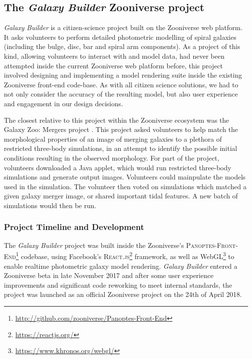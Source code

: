 \documentclass[../main.tex]{subfiles}
\begin{document}
\label{sec:method}

\subsection{The \textit{Galaxy Builder} Zooniverse project}

\textit{Galaxy Builder} is a citizen-science project built on the Zooniverse web platform. It asks volunteers to perform detailed photometric modelling of spiral galaxies (including the bulge, disc, bar and spiral arm components). As a project of this kind, allowing volunteers to interact with and model data, had never been attempted inside the current Zooniverse web platform before, this project involved designing and implementing a model rendering suite inside the existing Zooniverse front-end code-base. As with all citizen science solutions, we had to not only consider the accuracy of the resulting model, but also user experience and engagement in our design decisions.

The closest relative to this project within the Zooniverse ecosystem was the Galaxy Zoo: Mergers project \citep{Holincheck2016:1604.00435v1}. This project asked volunteers to help match the morphological properties of an image of merging galaxies to a plethora of restricted three-body simulations, in an attempt to identify the possible initial conditions resulting in the observed morphology. For part of the project, volunteers downloaded a Java applet, which would run restricted three-body simulations and generate output images. Volunteers could mainpulate the models used in the simulation. The volunteer then voted on simulations which matched a given galaxy merger image, or shared important tidal features. A new batch of simulations would then be run.

\subsubsection{Project Timeline and Development}

The \textit{Galaxy Builder} project was built inside the Zooniverse's \citep{Simpson:2014:ZOW:2567948.2579215} \textsc{Panoptes-Front-End}\footnote{\url{http://github.com/zooniverse/Panoptes-Front-End}} codebase, using Facebook's \textsc{React.js}\footnote{\url{https://reactjs.org/}} framework, as well as WebGL\footnote{\url{https://www.khronos.org/webgl/}} to enable realtime photometric galaxy model rendering. \textit{Galaxy Builder} entered a Zooniverse beta in late November 2017 and after some user experience improvements and significant code reworking to meet internal standards, the project was launched as an official Zooniverse project on the 24th of April 2018.
\end{document}
